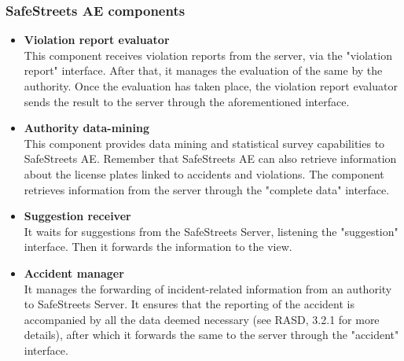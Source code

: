 \documentclass{article}
\begin{document}
		\subsubsection{SafeStreets AE components}
		\begin{itemize}
			\item \textbf{Violation report evaluator}\\
			This component receives violation reports from the server, via the "violation report" interface. After that, it manages the evaluation of the same by the authority. Once the evaluation has taken place, the violation report evaluator sends the result to the server through the aforementioned interface.
			\item \textbf{Authority data-mining}\\
			This component provides data mining and statistical survey capabilities to SafeStreets AE. Remember that SafeStreets AE can also retrieve information about the license plates linked to accidents and violations. The component retrieves information from the server through the "complete data" interface.
			\item \textbf{Suggestion receiver}\\
			It waits for suggestions from the SafeStreets Server, listening the "suggestion" interface. Then it forwards the information to the view.
			\item \textbf{Accident manager}\\
			It manages the forwarding of incident-related information from an authority to SafeStreets Server. It ensures that the reporting of the accident is accompanied by all the data deemed necessary (see RASD, 3.2.1 for more details), after which it forwards the same to the server through the "accident" interface.
		\end{itemize}
\end{document}
